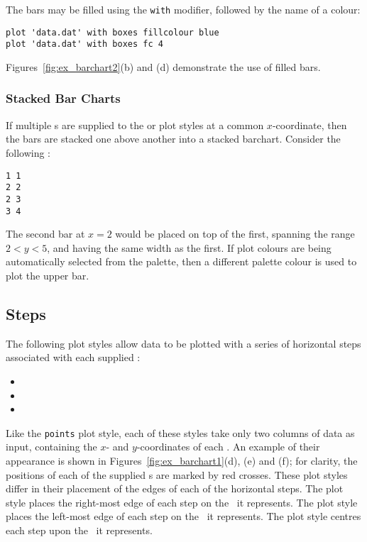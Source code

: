 The bars may be filled using the {\tt with}  modifier,
followed by the name of a colour:

\begin{verbatim}
plot 'data.dat' with boxes fillcolour blue
plot 'data.dat' with boxes fc 4
\end{verbatim}

\noindent Figures~\ref{fig:ex_barchart2}(b) and (d) demonstrate the use of
filled bars.

\subsubsection{Stacked Bar Charts}

If multiple \datapoint s are supplied to the  or 
plot styles at a common $x$-coordinate, then the bars are stacked one above
another into a stacked barchart. Consider the following \datafile:

\begin{verbatim}
1 1
2 2
2 3
3 4
\end{verbatim}

\noindent The second bar at $x=2$ would be placed on top of the first, spanning
the range $2<y<5$, and having the same width as the first. If plot colours are
being automatically selected from the palette, then a different palette colour
is used to plot the upper bar.

\subsection{Steps}

The following plot styles allow data to be plotted with a series of horizontal
steps associated with each supplied \datapoint:
\begin{itemize}
\item {}
\item {}
\item {}
\end{itemize}
Like the {\tt points} plot style, each of these styles take only two columns of
data as input, containing the $x$- and $y$-coordinates of each \datapoint.  An
example of their appearance  is shown in Figures~\ref{fig:ex_barchart1}(d), (e)
and (f); for clarity, the positions of each of the supplied \datapoint s are
marked by red crosses.  These plot styles differ in their placement of the
edges of each of the horizontal steps.  The  plot style places
the right-most edge of each step on the \datapoint\ it represents.  The
 plot style places the left-most edge of each step on the
\datapoint\ it represents.  The  plot style centres each step
upon the \datapoint\ it represents.

